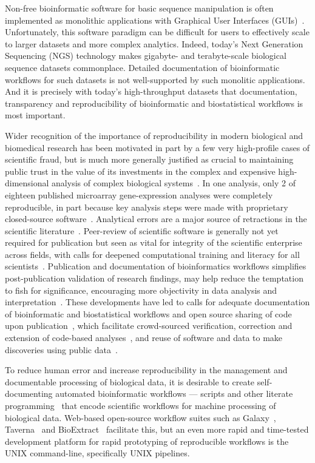 \documentclass{frontiersSCNS} %
\begin{document}
Non-free bioinformatic software for basic sequence manipulation is
often implemented as monolithic applications with Graphical User
Interfaces (GUIs)~\citep{Smith1994, Rampp2006,
  Librado01062009,gouy2010seaview}.  Unfortunately, this software
paradigm can be difficult for users to effectively scale to larger
datasets and more complex analytics.  Indeed, today's Next Generation
Sequencing (NGS) technology makes gigabyte- and terabyte-scale
biological sequence datasets commonplace.  Detailed documentation of
bioinformatic workflows for such datasets is not well-supported by
such monolitic applications. And it is precisely with today's
high-throughput datasets that documentation, transparency and
reproducibility of bioinformatic and biostatistical workflows is most
important.

Wider recognition of the importance of reproducibility in modern
biological and biomedical research has been motivated in part by a few
very high-profile cases of scientific fraud, but is much more
generally justified as crucial to maintaining public trust in the
value of its investments in the complex and expensive high-dimensional
analysis of complex biological
systems~\citep{BaggerlyCoombes2009,hutson2010data,Baggerly01052011,Huang01072013}.
In one analysis, only 2 of eighteen published microarray
gene-expression analyses were completely reproducible, in part because
key analysis steps were made with proprietary closed-source
software~\citep{Ioannidis:2008cr}. Analytical errors are a major
source of retractions in the scientific
literature~\citep{Casadevall01092014}. Peer-review of scientific
software is generally not yet required for publication but seen as
vital for integrity of the scientific enterprise across fields, with
calls for deepened computational training and literacy for all
scientists~\citep{Morin13042012,Joppa17052013}. Publication and
documentation of bioinformatics workflows simplifies post-publication
validation of research findings, may help reduce the temptation to
fish for significance, encouraging more objectivity in data analysis
and interpretation~\citep{Boulesteix01022010}. These developments have
led to calls for adequate documentation of bioinformatic and
biostatistical workflows and open source sharing of code upon
publication~\citep{Peng01072009}, which facilitate crowd-sourced
verification, correction and extension of code-based
analyses~\citep{barnes2010publish,Morin13042012}, and reuse of
software and data to make discoveries using public
data~\citep{Peng02122011}.

To reduce human error and increase reproducibility in the management
and documentable processing of biological data, it is desirable to
create self-documenting automated bioinformatic workflows --- scripts
and other literate programming~\citep{knuth1984literate} that encode
scientific workflows for machine processing of biological
data. Web-based open-source workflow suites such as
Galaxy~\citep{galaxy14}, Taverna~\citep{CPE:CPE993} and
BioExtract~\citep{Lushbough01072011} facilitate this, but an even more
rapid and time-tested development platform for rapid prototyping of
reproducible workflows is the UNIX command-line, specifically UNIX
pipelines.
\end{document}
